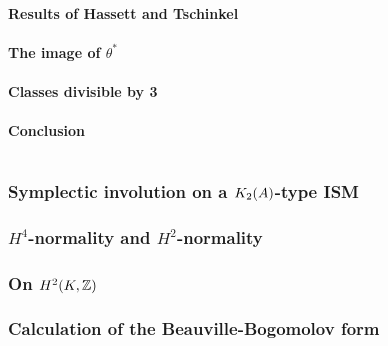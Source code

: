 \documentclass{amsart}
\begin{document}
	\subsection{Results of Hassett and Tschinkel}
	\subsection{The image of $\theta^*$}
	\subsection{Classes divisible by 3}
	\subsection{Conclusion}
	
\part{}
\section{Symplectic involution on a $\kum{A}{2}$-type ISM}
\section{$H^4$-normality and $H^2$-normality}
\section{On $H^2(K,\Z)$}
\section{Calculation of the Beauville-Bogomolov form}


\end{document}

